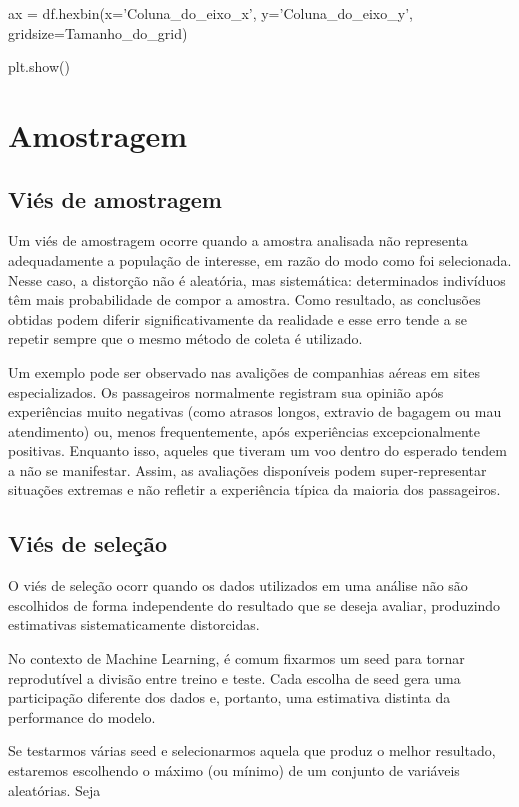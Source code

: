 \documentclass{article}
\begin{document}
\begin{pythoncode}
ax = df.hexbin(x='Coluna_do_eixo_x', y='Coluna_do_eixo_y', gridsize=Tamanho_do_grid)

plt.show()
\end{pythoncode}

\section{Amostragem}

\subsection{Viés de amostragem}

Um viés de amostragem ocorre quando a amostra analisada não representa adequadamente a população de interesse, em razão do modo como foi selecionada. Nesse caso, a distorção não é aleatória, mas sistemática: determinados indivíduos têm mais probabilidade de compor a amostra. Como resultado, as conclusões obtidas podem diferir significativamente da realidade e esse erro tende a se repetir sempre que o mesmo método de coleta é utilizado.

Um exemplo pode ser observado nas avalições de companhias aéreas em sites especializados. Os passageiros normalmente registram sua opinião após experiências muito negativas (como atrasos longos, extravio de bagagem ou mau atendimento) ou, menos frequentemente, após experiências excepcionalmente positivas. Enquanto isso, aqueles que tiveram um voo dentro do esperado tendem a não se manifestar. Assim, as avaliações disponíveis podem super-representar situações extremas e não refletir a experiência típica da maioria dos passageiros.

\subsection{Viés de seleção}

O viés de seleção ocorr  quando os dados utilizados em uma análise não são escolhidos de forma independente do resultado que se deseja avaliar, produzindo estimativas sistematicamente distorcidas.

No contexto de Machine Learning, é comum fixarmos um seed para tornar reprodutível a divisão entre treino e teste. Cada escolha de seed gera uma participação diferente dos dados e, portanto, uma estimativa distinta da performance do modelo.

Se testarmos várias seed e selecionarmos aquela que produz o melhor resultado, estaremos escolhendo o máximo (ou mínimo) de um conjunto de variáveis aleatórias. Seja
\end{document}

